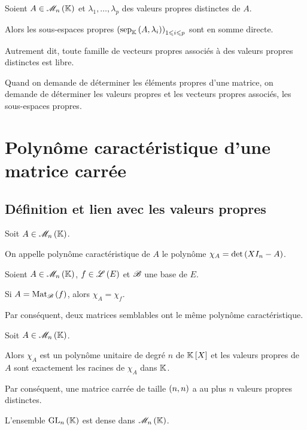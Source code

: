 \begin{theo}
Soient \(A\in\M{n}\) et \(\lambda_1,\dots,\lambda_p\) des valeurs propres distinctes de \(A\).

Alors les sous-espaces propres \(\paren{\sep[\K]{A}{\lambda_i}}_{1\leq i\leq p}\) sont en somme directe.

Autrement dit, toute famille de vecteurs propres associés à des valeurs propres distinctes est libre.
\end{theo}

\begin{rem}
Quand on demande de déterminer les éléments propres d'une matrice, on demande de déterminer les valeurs propres et les vecteurs propres associés, \ie les sous-espaces propres.
\end{rem}

\section{Polynôme caractéristique d'une matrice carrée}

\subsection{Définition et lien avec les valeurs propres}

\begin{defi}
Soit \(A\in\M{n}\).

On appelle polynôme caractéristique de \(A\) le polynôme \(\chi_A=\det\left(XI_n-A\right)\).
\end{defi}

\begin{prop}
Soient \(A\in\M{n}\), \(f\in\mathscr{L}\left(E\right)\) et \(\mathscr{B}\) une base de \(E\).

Si \(A=\Mat{f}\), alors \(\chi_A=\chi_f\).
\end{prop}

Par conséquent, deux matrices semblables ont le même polynôme caractéristique.

\begin{theo}
Soit \(A\in\M{n}\).

Alors \(\chi_A\) est un polynôme unitaire de degré \(n\) de \(\poly\) et les valeurs propres de \(A\) sont exactement les racines de \(\chi_A\) dans \(\mathbb{K}\).

Par conséquent, une matrice carrée de taille \(\left(n,n\right)\) a au plus \(n\) valeurs propres distinctes.
\end{theo}

\begin{cor}
L'ensemble \(\GL{n}\) est dense dans \(\M{n}\).
\end{cor}

